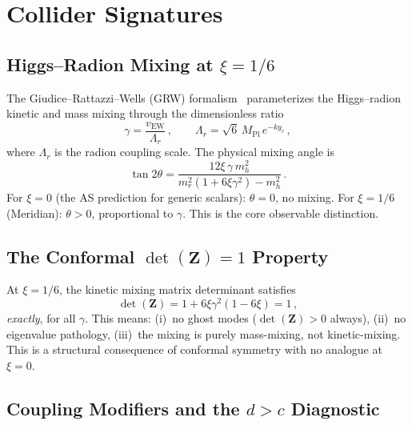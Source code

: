 \section{Collider Signatures}
\label{sec:4-collider}

\subsection{Higgs--Radion Mixing at $\xi = 1/6$}
\label{sec:4-higgs-radion}

The Giudice--Rattazzi--Wells (GRW) formalism~\cite{ch4:GRW2001} parameterizes the Higgs--radion kinetic and mass mixing through the dimensionless ratio
\begin{equation}
  \gamma = \frac{v_{\mathrm{EW}}}{\Lambda_r}\,, \qquad
  \Lambda_r = \sqrt{6}\, M_{\mathrm{Pl}}\, e^{-ky_c}\,,
  \label{eq:4-101}
\end{equation}
where $\Lambda_r$ is the radion coupling scale. The physical mixing angle is~\cite{ch4:GRW2001}
\begin{equation}
  \tan 2\theta = \frac{12\xi\, \gamma\, m_h^2}{m_r^2(1 + 6\xi\gamma^2) - m_h^2}\,.
  \label{eq:4-102}
\end{equation}
For $\xi = 0$ (the AS prediction for generic scalars): $\theta = 0$, no mixing. For $\xi = 1/6$ (Meridian): $\theta > 0$, proportional to $\gamma$. This is the core observable distinction.

\subsection{The Conformal $\det(\mathbf{Z}) = 1$ Property}
\label{sec:4-det-z}

At $\xi = 1/6$, the kinetic mixing matrix determinant satisfies
\begin{equation}
  \det(\mathbf{Z}) = 1 + 6\xi\gamma^2(1 - 6\xi) = 1\,,
  \label{eq:4-103}
\end{equation}
\emph{exactly}, for all $\gamma$. This means: (i)~no ghost modes ($\det(\mathbf{Z}) > 0$ always), (ii)~no eigenvalue pathology, (iii)~the mixing is purely mass-mixing, not kinetic-mixing. This is a structural consequence of conformal symmetry with no analogue at $\xi = 0$.

\subsection{Coupling Modifiers and the $d > c$ Diagnostic}
\label{sec:4-coupling-modifiers}

